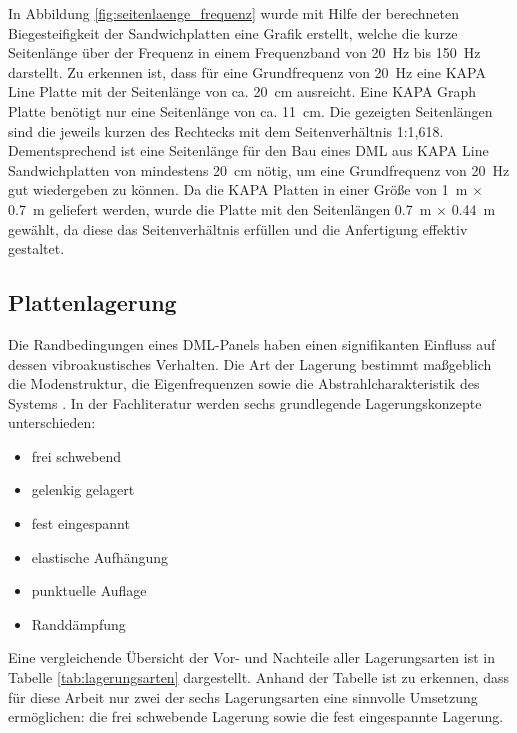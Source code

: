 In Abbildung \ref{fig:seitenlaenge_frequenz} wurde mit Hilfe der berechneten Biegesteifigkeit der Sandwichplatten eine Grafik erstellt, welche die kurze Seitenlänge über der Frequenz in einem Frequenzband von \SI{20}{\hertz} bis \SI{150}{\hertz} darstellt. Zu erkennen ist, dass für eine Grundfrequenz von \SI{20}{\hertz} eine KAPA Line Platte mit der Seitenlänge von ca. \SI{20}{\centi\meter} ausreicht. Eine KAPA Graph Platte benötigt nur eine Seitenlänge von ca. \SI{11}{\centi\meter}. Die gezeigten Seitenlängen sind die jeweils kurzen des Rechtecks mit dem Seitenverhältnis 1:1,618.
Dementsprechend ist eine Seitenlänge für den Bau eines DML aus KAPA Line Sandwichplatten von mindestens \SI{20}{\centi\meter} nötig, um eine Grundfrequenz von \SI{20}{\hertz} gut wiedergeben zu können. Da die KAPA Platten in einer Größe von \SI{1}{\meter} $\times$ \SI{0,7}{\meter} geliefert werden, wurde die Platte mit den Seitenlängen \SI{0,7}{\meter} $\times$ \SI{0,44}{\meter} gewählt, da diese das Seitenverhältnis erfüllen und die Anfertigung effektiv gestaltet.


\newpage

\subsection{Plattenlagerung}

Die Randbedingungen eines DML-Panels haben einen signifikanten Einfluss auf dessen vibroakustisches Verhalten. Die Art der Lagerung bestimmt maßgeblich die Modenstruktur, die Eigenfrequenzen sowie die Abstrahlcharakteristik des Systems \cite{Cremer1996}. In der Fachliteratur werden sechs grundlegende Lagerungskonzepte unterschieden:

\begin{itemize}
    \item frei schwebend
    \item gelenkig gelagert
    \item fest eingespannt
    \item elastische Aufhängung
    \item punktuelle Auflage
    \item Randdämpfung
\end{itemize}

Eine vergleichende Übersicht der Vor- und Nachteile aller Lagerungsarten ist in Tabelle \ref{tab:lagerungsarten} dargestellt. Anhand der Tabelle ist zu erkennen, dass für diese Arbeit nur zwei der sechs Lagerungsarten eine sinnvolle Umsetzung ermöglichen: die frei schwebende Lagerung sowie die fest eingespannte Lagerung.

